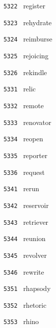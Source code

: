 \documentclass[11pt]{article}
\begin{document}
\begin{multicols}{6}
\noindent \texttt{ 5322 } \hspace{1mm} register  \par
\noindent \texttt{ 5323 } \hspace{1mm} rehydrate  \par
\noindent \texttt{ 5324 } \hspace{1mm} reimburse  \par
\noindent \texttt{ 5325 } \hspace{1mm} rejoicing  \par
\noindent \texttt{ 5326 } \hspace{1mm} rekindle  \par
\noindent \texttt{ 5331 } \hspace{1mm} relic  \par
\noindent \texttt{ 5332 } \hspace{1mm} remote  \par
\noindent \texttt{ 5333 } \hspace{1mm} renovator  \par
\noindent \texttt{ 5334 } \hspace{1mm} reopen  \par
\noindent \texttt{ 5335 } \hspace{1mm} reporter  \par
\noindent \texttt{ 5336 } \hspace{1mm} request  \par
\noindent \texttt{ 5341 } \hspace{1mm} rerun  \par
\noindent \texttt{ 5342 } \hspace{1mm} reservoir  \par
\noindent \texttt{ 5343 } \hspace{1mm} retriever  \par
\noindent \texttt{ 5344 } \hspace{1mm} reunion  \par
\noindent \texttt{ 5345 } \hspace{1mm} revolver  \par
\noindent \texttt{ 5346 } \hspace{1mm} rewrite  \par
\noindent \texttt{ 5351 } \hspace{1mm} rhapsody  \par
\noindent \texttt{ 5352 } \hspace{1mm} rhetoric  \par
\noindent \texttt{ 5353 } \hspace{1mm} rhino  \par

\end{multicols}
\end{document}
